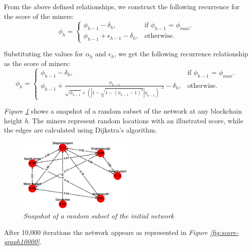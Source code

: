 \documentclass[letterpaper,11pt]{article}
\begin{document}
From the above defined relationships, we construct the following recurrence for the score of the miners:
\begin{equation*} \label{score}
	\phi_h = \begin{cases}
		\phi_{h-1} - \delta_h, &\text{if $\phi_{h-1}$ = $\phi_{max}$.}\\
		\phi_{h-1} + \epsilon_{h-1} - \delta_h, &\text{otherwise}.
	\end{cases}
\end{equation*}

Substituting the values for $\alpha_h$ and $\epsilon_h$, we get the following recurrence relationship as the score of miners:
\begin{equation*} \label{recurrence}
	\phi_h = \begin{cases}
		\phi_{h-1} - \delta_h, &\text{if $\phi_{h-1}$ = $\phi_{max}$.}\\
		\phi_{h-1} + \frac{\phi_{h-1}}{\sqrt{\phi_{h-1}} + \left(\left\lvert1 - \sqrt{1 - (\phi_{h-1} - 1)^2}\right\rvert \eta_{h-1}\right)^{-2}} -\delta_h, &\text{otherwise}.
	\end{cases}
\end{equation*}

\emph{Figure \ref{fig:score-graph}} shows a snapshot of a random subset of the network at any blockchain height \textit{h}. The miners represent random locations with an illustrated score, while the edges are calculated using Dijkstra's algorithm\cite{dijkstra}.
\begin{figure}[H]
    \begin{center}
          \includegraphics[width=0.5\textwidth]{graph.eps}
          \caption{\emph{Snapshot of a random subset of the initial network}}
          \label{fig:score-graph}
     \end{center}
\end{figure}

After 10,000 iterations the network appears as represented in \emph{Figure \ref{fig:score-graph10000}}. 
\end{document}
